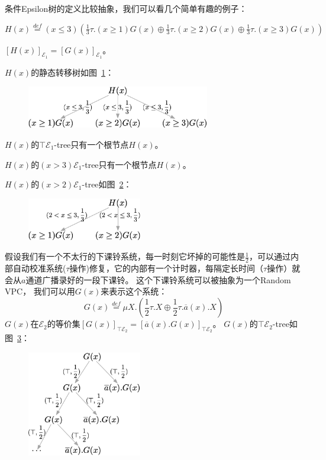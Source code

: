 条件Epsilon树的定义比较抽象，我们可以看几个简单有趣的例子：
\begin{example}
   $H(x)\stackrel{def}{=}(x\leq 3)(\frac{1}{3}\tau.(x\geq 1)G(x)\oplus\frac{1}{3}\tau.(x\geq 2)G(x)\oplus\frac{1}{3}\tau.(x\geq 3)G(x))$

   $[H(x)]_{\mathcal{E}_1} = [G(x)]_{\mathcal{E}_1}$。

   $H(x)$的静态转移树如图~\ref{fig_eg0_1}：
   \begin{figure}[!htbp]
      \caption[]{}
      \small
      \centering
      \includegraphics[width=8cm]{../figure/example0_1.png}
       \label{fig_eg0_1}
   \end{figure}

   $H(x)$的$\top\mathcal{E}_1$-tree只有一个根节点$H(x)$。

   $H(x)$的$(x>3)\mathcal{E}_1$-tree只有一个根节点$H(x)$。

   $H(x)$的$(x>2)\mathcal{E}_1$-tree如图~\ref{fig_eg0_2}：
   \begin{figure}[!htbp]
      \caption[]{}
      \small
      \centering
      \includegraphics[width=5cm]{../figure/example0_2.png}
       \label{fig_eg0_2}
   \end{figure}
\end{example}
\begin{example}\label{eg:1}
      假设我们有一个不太行的下课铃系统，每一时刻它坏掉的可能性是$\frac{1}{2}$，可以通过内部自动校准系统($\tau$操作)修复，它的内部有一个计时器，每隔定长时间（$\tau$操作）就会从$a$通道广播录好的一段下课铃。
      这个下课铃系统可以被抽象为一个Random VPC，
      我们可以用$G(x)$来表示这个系统：
      $$G(x)\stackrel{def}{=}\mu X.(\frac{1}{2}\tau.X\oplus \frac{1}{2}\tau.\overline{a}(x).X)$$
      $G(x)$在$\mathcal{E}_2$的等价集$[G(x)]_{\top\mathcal{E}_2} = [\overline{a}(x).G(x)]_{\top\mathcal{E}_2}$。
      $G(x)$的$\top \mathcal{E}_2$-tree如图~\ref{fig_eg1}：
      \begin{figure}[!htbp]
         \caption[]{}
         \small
         \centering
         \includegraphics[width=5cm]{../figure/example1.png}
          \label{fig_eg1}
      \end{figure}
\end{example}
